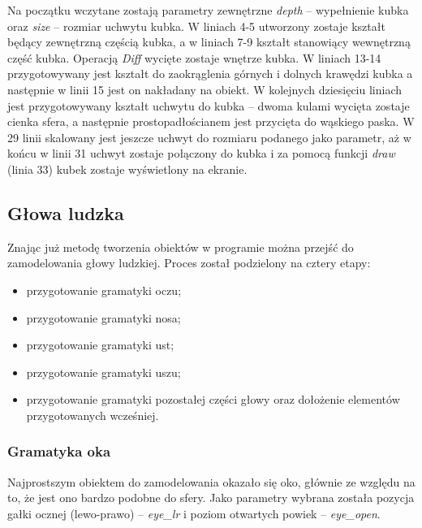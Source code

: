 Na początku wczytane zostają parametry zewnętrzne {\em depth} -- wypełnienie
kubka oraz {\em size} -- rozmiar uchwytu kubka. W liniach 4-5 utworzony zostaje
kształt będący zewnętrzną częścią kubka, a w liniach 7-9 kształt stanowiący
wewnętrzną część kubka. Operacją {\em Diff} wycięte zostaje wnętrze kubka.
W liniach 13-14 przygotowywany jest kształt do zaokrąglenia górnych i dolnych
krawędzi kubka a następnie w linii 15 jest on nakładany na obiekt. W kolejnych
dziesięciu liniach jest przygotowywany kształt uchwytu do kubka -- dwoma kulami
wycięta zostaje cienka sfera, a następnie prostopadłościanem jest przycięta do
wąskiego paska. W 29 linii skalowany jest jeszcze uchwyt do rozmiaru podanego
jako parametr, aż w końcu w linii 31 uchwyt zostaje połączony do kubka i za
pomocą funkcji {\em draw} (linia 33) kubek zostaje wyświetlony na ekranie.

\subsection{Głowa ludzka}
Znając już metodę tworzenia obiektów w programie można przejść do zamodelowania
głowy ludzkiej. Proces został podzielony na cztery etapy:
\begin{itemize}
  \item przygotowanie gramatyki oczu;
  \item przygotowanie gramatyki nosa;
  \item przygotowanie gramatyki ust;
  \item przygotowanie gramatyki uszu;
  \item przygotowanie gramatyki pozostałej części głowy oraz dołożenie elementów
  przygotowanych wcześniej.
\end{itemize}

\subsubsection{Gramatyka oka}
Najprostszym obiektem do zamodelowania okazało się oko, głównie ze względu na
to, że jest ono bardzo podobne do sfery. Jako parametry wybrana została pozycja
gałki ocznej (lewo-prawo) -- {\em eye\_lr} i poziom otwartych powiek -- {\em eye\_open}.

